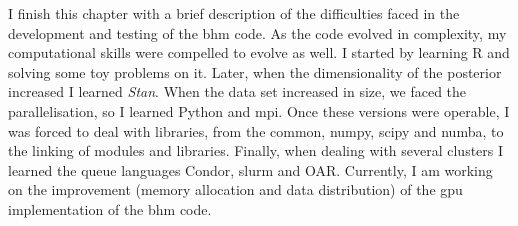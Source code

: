I finish this chapter with a brief description of the difficulties faced in the development and testing of the \gls{bhm} code. As the code evolved in complexity, my computational skills were compelled to evolve as well. I started by learning R and solving some toy problems on it. Later, when the dimensionality of the posterior increased I learned \emph{Stan}. When the data set increased in size, we faced the parallelisation, so I learned Python and \gls{mpi}. Once these versions were operable, I was forced to deal with libraries, from the common, numpy, scipy and numba, to the linking of modules and libraries. Finally, when dealing with several clusters I learned the queue languages Condor, slurm and OAR. Currently, I am working on the improvement (memory allocation and data distribution) of the \gls{gpu} implementation of the \gls{bhm} code.  



